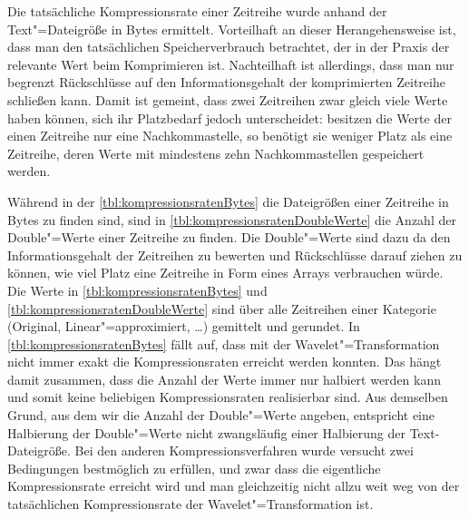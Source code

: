 Die tatsächliche Kompressionsrate einer Zeitreihe wurde anhand der Text"=Dateigröße in Bytes ermittelt. Vorteilhaft an dieser Herangehensweise ist, dass man den tatsächlichen Speicherverbrauch betrachtet, der in der Praxis der relevante Wert beim Komprimieren ist. Nachteilhaft ist allerdings, dass man nur begrenzt Rückschlüsse auf den Informationsgehalt der komprimierten Zeitreihe schließen kann. Damit ist gemeint, dass zwei Zeitreihen zwar gleich viele Werte haben können, sich ihr Platzbedarf jedoch unterscheidet: besitzen die Werte der einen Zeitreihe nur eine Nachkommastelle, so benötigt sie weniger Platz als eine Zeitreihe, deren Werte mit mindestens zehn Nachkommastellen gespeichert werden. 

Während in der \autoref{tbl:kompressionsratenBytes} die Dateigrößen einer Zeitreihe in Bytes zu finden sind, sind in \autoref{tbl:kompressionsratenDoubleWerte} die Anzahl der Double"=Werte einer Zeitreihe zu finden. Die Double"=Werte sind dazu da den Informationsgehalt der Zeitreihen zu bewerten und Rückschlüsse darauf ziehen zu können, wie viel Platz eine Zeitreihe in Form eines Arrays verbrauchen würde. Die Werte in \autoref{tbl:kompressionsratenBytes} und \autoref{tbl:kompressionsratenDoubleWerte} sind über alle Zeitreihen einer Kategorie (Original, Linear"=approximiert, \dots) gemittelt und gerundet. In \autoref{tbl:kompressionsratenBytes} fällt auf, dass mit der Wavelet"=Transformation nicht immer exakt die Kompressionsraten erreicht werden konnten. Das hängt damit zusammen, dass die Anzahl der Werte immer nur halbiert werden kann und somit keine beliebigen Kompressionsraten realisierbar sind. Aus demselben Grund, aus dem wir die Anzahl der Double"=Werte angeben, entspricht eine Halbierung der Double"=Werte nicht zwangsläufig einer Halbierung der Text-Dateigröße. Bei den anderen Kompressionsverfahren wurde versucht zwei Bedingungen bestmöglich zu erfüllen, und zwar dass die eigentliche Kompressionsrate erreicht wird und man gleichzeitig nicht allzu weit weg von der tatsächlichen Kompressionsrate der Wavelet"=Transformation ist.

